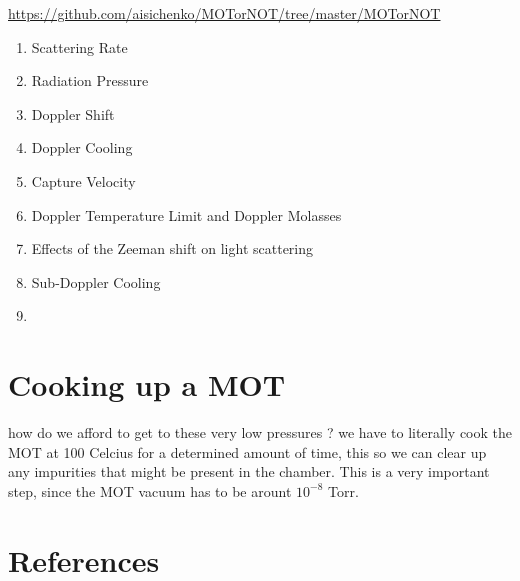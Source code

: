 \documentclass[10pt]{article}
\begin{document}
\url{https://github.com/aisichenko/MOTorNOT/tree/master/MOTorNOT}


\begin{enumerate}
    \item Scattering Rate
    \item Radiation Pressure
    \item Doppler Shift
    \item Doppler Cooling
    \item Capture Velocity
    \item Doppler Temperature Limit and Doppler Molasses
    \item Effects of the Zeeman shift on light scattering
    \item Sub-Doppler Cooling
    \item 
\end{enumerate}


\section*{Cooking up a MOT}
how do we afford to get to these very low pressures ? we have to literally cook the MOT at 100 Celcius for a determined amount of time, this so we can clear up any impurities that might be present in the chamber. This is a very important step, since the MOT vacuum has to be arount $10^{-8}$ Torr.

\newpage
\section*{References}


\end{document}

